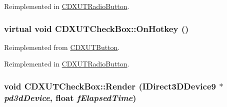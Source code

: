 Reimplemented in \hyperlink{class_c_d_x_u_t_radio_button_aab0a615727913f7f6c8e8d35cc2220e6}{CDXUTRadioButton}.\hypertarget{class_c_d_x_u_t_check_box_a5d9a74ce30be05f4867945c80f298a0a}{
\subsubsection[{OnHotkey}]{\setlength{\rightskip}{0pt plus 5cm}virtual void CDXUTCheckBox::OnHotkey ()}}
\label{class_c_d_x_u_t_check_box_a5d9a74ce30be05f4867945c80f298a0a}


Reimplemented from \hyperlink{class_c_d_x_u_t_button_ae63ba50da1c035a9aaa983bafd5eae97}{CDXUTButton}.

Reimplemented in \hyperlink{class_c_d_x_u_t_radio_button_a2950447936727f33130fa4f6928045ac}{CDXUTRadioButton}.\hypertarget{class_c_d_x_u_t_check_box_a518c5e4d5250b1c0be83bf456c43f8b8}{
\subsubsection[{Render}]{\setlength{\rightskip}{0pt plus 5cm}void CDXUTCheckBox::Render (IDirect3DDevice9 $\ast$ {\em pd3dDevice}, \/  float {\em fElapsedTime})}}
\label{class_c_d_x_u_t_check_box_a518c5e4d5250b1c0be83bf456c43f8b8}


